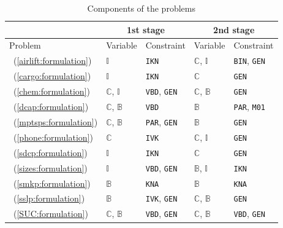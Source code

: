 \begin{table}[H]
	\centering
	\caption{Components of the problems}
	\label{table:prob_class}
	\begin{threeparttable}
		\begin{tabular}{@{}lllll@{}}
			\toprule
			& \multicolumn{2}{c}{1st stage}                              				  	& \multicolumn{2}{c}{2nd stage}                             			        \\ \midrule
			Problem 	     & Variable                    & Constraint                   	& Variable                    & Constraint                  				    \\ \midrule
			\airlift\ (\ref{airlift:formulation}) & $\mathbb{I}$ & \texttt{IKN}& $\mathbb{C}$, $\mathbb{I}$ & \texttt{BIN}, \texttt{GEN}\\
			\cargo\ (\ref{cargo:formulation}) & $\mathbb{I}$ & \texttt{IKN} & $\mathbb{C}$ & \texttt{GEN}\\		
			\chem\ (\ref{chem:formulation}) & $\mathbb{C}$, $\mathbb{I}$ & \texttt{VBD}, \texttt{GEN} & $\mathbb{C}$, $\mathbb{B}$ & \texttt{GEN}\\				
			\dcap\ (\ref{dcap:formulation})    & $\mathbb{C}$, $\mathbb{B}$  & \texttt{VBD}                	& $\mathbb{B}$                & \texttt{PAR}, \texttt{M01} 			    		\\
			\mptsps\ (\ref{mptsps:formulation})  & $\mathbb{C}$, $\mathbb{B}$  & \texttt{PAR}, \texttt{GEN}		& $\mathbb{B}$                & \texttt{GEN}               						\\
			\phone\ (\ref{phone:formulation}) & $\mathbb{C}$ & \texttt{IVK} & $\mathbb{C}$, $\mathbb{I}$ & \texttt{GEN} \\			
			\sdcp\ (\ref{sdcp:formulation}) & $\mathbb{I}$ & \texttt{IKN}& $\mathbb{C}$ & \texttt{GEN}\\
			\sizes\ (\ref{sizes:formulation})   & $\mathbb{I}$ 			   & \texttt{VBD}, \texttt{GEN} 	& $\mathbb{B}$, $\mathbb{I}$  & \texttt{IKN}             						\\
			\smkp\ (\ref{smkp:formulation})   & $\mathbb{B}$                & \texttt{KNA}                	& $\mathbb{B}$                & \texttt{KNA}              						\\
			\sslp\ (\ref{sslp:formulation})   & $\mathbb{B}$                & \texttt{IVK}, \texttt{GEN} 	& $\mathbb{C}$, $\mathbb{B}$  & \texttt{GEN}             						\\
			\suc\ (\ref{SUC:formulation})   & $\mathbb{C}$, $\mathbb{B}$                 & \texttt{VBD}, \texttt{GEN}       	& $\mathbb{C}$, $\mathbb{B}$  &  \texttt{VBD}, \texttt{GEN}                                  					\\ \bottomrule
		\end{tabular}
		

\end{threeparttable}
\end{table}
